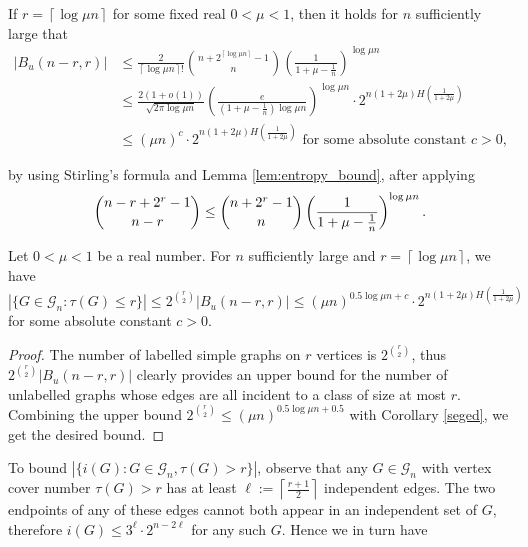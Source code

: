 \documentclass[10pt,a4paper]{article}
\numberwithin{equation}{section}
\newcommand{\cG}{\mathcal{G}}
\begin{document}
\begin{cor} \label{seged}
    If $r=\left\lceil \log \mu n\right\rceil$ for some fixed real $0<\mu<1$, then it holds for $n$ sufficiently large that
    \begin{equation*}
        \begin{split}
            |B_u(n-r,r)| &\le \frac{2}{\left\lceil\log \mu n\right\rceil!}\binom{n+2^{\left\lceil \log \mu n\right\rceil}-1}{n} \left(\frac{1}{1+\mu-\frac{1}{n}}\right)^{\log \mu n}\\
            &\le \frac{2(1+o(1))}{\sqrt{2\pi \log \mu n}}\left(\frac{e}{(1+\mu-\frac{1}{n})\log{\mu n} }\right)^{\log{\mu n}}\cdot 2^{n(1+2\mu)H\left(\frac{1}{1+2\mu}\right)}\\ 
            &\le
           (\mu n)^{
           c}\cdot 2^{n(1+2\mu)H\left(\frac{1}{1+2\mu}\right)} \text{\ \ for some absolute constant $c>0$,} 
        \end{split} 
    \end{equation*} 
   
   \noindent by using Stirling's formula and Lemma \ref{lem:entropy_bound}, after applying
\begin{equation*}
{n-r+2^r-1\choose n-r} \le {n+2^r-1\choose n}\left(\frac{1}{1+\mu-\frac{1}{n}}\right)^{\log \mu n}.\qedhere
\end{equation*}
    
 \begin{cor}\label{lem:kis_nu}
    Let $0<\mu<1$ be a real number. For $n$ sufficiently large and $r=\left\lceil \log\mu n\right\rceil$, we have
$$  |\{G\in \cG_n: \tau(G)\le r\}|\le 2^{\binom{r}{2}} |B_u(n-r,r)|\le (\mu n)^{0.5 \log{\mu n}+c}\cdot 2^{n(1+2\mu)H\left(\frac{1}{1+2\mu}\right)}$$ for some absolute constant $c>0$.
\end{cor}

\begin{proof}
The number of labelled simple graphs on $r$ vertices is $2^{\binom{r}{2}}$,  thus $2^{\binom{r}{2}} |B_u(n-r,r)|$ clearly provides an upper bound for the number of unlabelled graphs whose edges are all incident to a class of size at most $r$. Combining the upper bound $2^{\binom{r}{2}}\le(\mu n)^{0.5 \log{\mu n}+0.5}$ with Corollary \ref{seged}, we get the desired bound.
\end{proof}
\end{cor}

    To bound $|\{i(G): G\in \cG_n, \tau(G)> r\}|$, observe that any $G\in \cG_n$ with vertex cover number $\tau(G)>r$ has at least $\ell:=\left\lceil\frac{r+1}{2}\right\rceil$ independent edges. The two endpoints of any of these edges cannot both appear in an independent set of $G$, therefore $i(G)\le 3^{\ell}\cdot 2^{n-2\ell}$ for any such $G$. Hence we in turn have 
        
\end{document}

